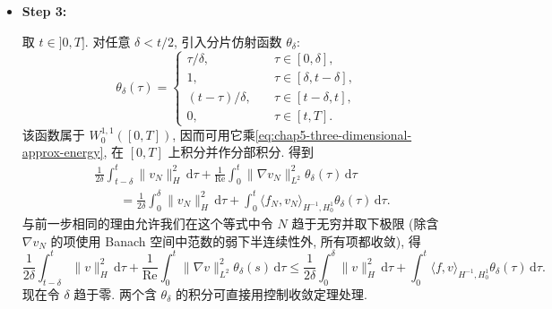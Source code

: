 \begin{itemize}
\[ \]
 在\eqref{eq:chap5-averaged-limit-energy}中令 $s\to0^+$ 并取上极限, 得到
 \begin{equation}
  \limsup_{s\to0^+}\frac1s\int_0^s\|v\|_H^2\,\mathrm dt
  \leq\|v_0\|_H^2.
  \label{eq:chap5-initial-energy-limsup}
 \end{equation}
 还需得到反向不等式. 使用 $v$ 弱连续取值于 $H$ (Proposition~\ref{prop:chap5-weak-solution-time-continuity}) 以及 Banach 空间中范数的弱下半连续性 (Corollary~\ref{cor:chap2-weak-lower-semicontinuity}), 有
 \[
  \|v_0\|_H^2=\|v(0)\|_H^2
  \leq\liminf_{s\to0^+}\|v(s)\|_H^2
  =\lim_{\sigma\to0^+}\inf_{t\in[0,\sigma]}\|v(t)\|_H^2.
 \]
 然而对任意 $s>0$,
 \[
  \inf_{t\in[0,s]}\|v(t)\|_H^2
  \leq\frac1s\int_0^s\|v(t)\|_H^2\,\mathrm dt.
 \]
 对该不等式取下极限, 得
 \begin{equation}
  \|v_0\|_H^2
  \leq\liminf_{s\to0^+}\frac1s\int_0^s\|v(t)\|_H^2\,\mathrm dt.
  \label{eq:chap5-initial-energy-liminf}
 \end{equation}
 联立\eqref{eq:chap5-initial-energy-limsup}和\eqref{eq:chap5-initial-energy-liminf}, 即证\eqref{eq:chap5-initial-energy-average}.

 \item \textbf{Step 3:}

 取 $t\in]0,T]$. 对任意 $\delta<t/2$, 引入分片仿射函数 $\theta_\delta$:
 \[
 \theta_\delta(\tau)=
 \left\{
 \begin{aligned}
  \tau/\delta,&\quad\tau\in[0,\delta],\\
  1,&\quad\tau\in[\delta,t-\delta],\\
  (t-\tau)/\delta,&\quad\tau\in[t-\delta,t],\\
  0,&\quad\tau\in[t,T].
 \end{aligned}
 \right.
 \]
 该函数属于 $W_0^{1,1}([0,T])$, 因而可用它乘\eqref{eq:chap5-three-dimensional-approx-energy}, 在 $[0,T]$ 上积分并作分部积分. 得到
 \begin{align*}
  &\frac1{2\delta}\int_{t-\delta}^t\|v_N\|_H^2\,\mathrm d\tau
  +\frac1{\operatorname{Re}}\int_0^t\|\nabla v_N\|_{L^2}^2\theta_\delta(\tau)\,\mathrm d\tau\\
  &\qquad=\frac1{2\delta}\int_0^\delta\|v_N\|_H^2\,\mathrm d\tau
  +\int_0^t\langle f_N,v_N\rangle_{H^{-1},H_0^1}\theta_\delta(\tau)\,\mathrm d\tau.
 \end{align*}
 与前一步相同的理由允许我们在这个等式中令 $N$ 趋于无穷并取下极限 (除含 $\nabla v_N$ 的项使用 Banach 空间中范数的弱下半连续性外, 所有项都收敛), 得
 \[
  \frac1{2\delta}\int_{t-\delta}^t\|v\|_H^2\,\mathrm d\tau
  +\frac1{\operatorname{Re}}\int_0^t\|\nabla v\|_{L^2}^2\theta_\delta(s)\,\mathrm d\tau
  \leq\frac1{2\delta}\int_0^\delta\|v\|_H^2\,\mathrm d\tau
  +\int_0^t\langle f,v\rangle_{H^{-1},H_0^1}\theta_\delta(\tau)\,\mathrm d\tau.
 \]
 现在令 $\delta$ 趋于零. 两个含 $\theta_\delta$ 的积分可直接用控制收敛定理处理.


\end{itemize}
